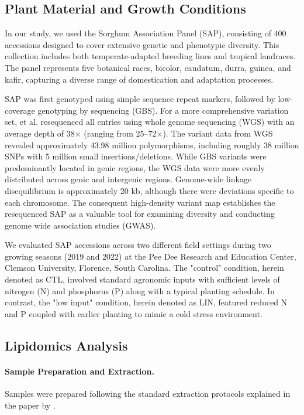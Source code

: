 \documentclass[9pt,twocolumn,twoside]{rilabRxiv}
\begin{document}
\subsection*{Plant Material and Growth Conditions}

In our study, we used the Sorghum Association Panel (SAP), consisting of 400 accessions designed to cover extensive genetic and phenotypic diversity. This collection includes both temperate-adapted breeding lines and tropical landraces. The panel represents five botanical races, bicolor, caudatum, durra, guinea, and kafir, capturing a diverse range of domestication and adaptation processes.

SAP was first genotyped using simple sequence repeat markers, followed by low-coverage genotyping by sequencing (GBS). For a more comprehensive variation set, \cite{Boatwright2022} et al. resequenced all entries using whole genome sequencing (WGS) with an average depth of 38× (ranging from 25–72×). The variant data from WGS revealed approximately 43.98 million polymorphisms, including roughly 38 million SNPs with 5 million small insertions/deletions. While GBS variants were predominantly located in genic regions, the WGS data were more evenly distributed across genic and intergenic regions. Genome-wide linkage disequilibrium is approximately 20 kb, although there were deviations specific to each chromosome. The consequent high-density variant map establishes the resequenced SAP as a valuable tool for examining diversity and conducting genome wide association studies (GWAS).

We evaluated SAP accessions across two different field settings during two growing seasons (2019 and 2022) at the Pee Dee Research and Education Center, Clemson University, Florence, South Carolina. The "control" condition, herein denoted as CTL, involved standard agronomic inputs with sufficient levels of nitrogen (N) and phosphorus (P) along with a typical planting schedule. In contrast, the "low input" condition, herein denoted as LIN,  featured reduced N and P coupled with earlier planting to mimic a cold stress environment.

\subsection*{Lipidomics Analysis}

\paragraph{Sample Preparation and Extraction.} 
Samples were prepared following the standard extraction protocols explained in the paper by \cite{Barnes2022}.
\end{document}
